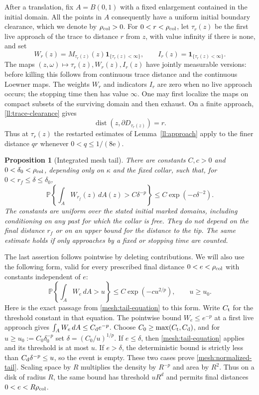 \documentclass[11pt]{article}
\newtheorem{proposition}[theorem]{Proposition}
\theoremstyle{definition}
\theoremstyle{remark}
\numberwithin{equation}{section}
\begin{document}
After a translation, fix $A=B(0,1)$ with a fixed enlargement contained in
the initial domain.  All the points in $A$ consequently have a uniform
initial boundary clearance, which we denote by $\rho_{\rm col}>0$.
For $0<r<\rho_{\rm col}$, let
$\tau_r(z)$ be the first live approach of the trace to distance $r$
from $z$, with value infinity if there is none, and set
\[
 W_r(z)=M_{\tau_r(z)}(z)\mathbf1_{\{\tau_r(z)<\infty\}},
 \qquad I_r(z)=\mathbf1_{\{\tau_r(z)<\infty\}}.
\]
The maps $(z,\omega)\mapsto\tau_r(z),W_r(z),I_r(z)$ have jointly
measurable versions: before killing this follows from continuous trace
distance and the continuous Loewner maps. The weights $W_r$ and
indicators $I_r$ are zero when no live approach occurs; the stopping
time then has value $\infty$.  One may first localize the maps on
compact subsets of the surviving domain and then exhaust.
On a finite approach, \eqref{ll:trace-clearance} gives
\[
 \operatorname{dist}(z,\partial D_{\tau_r(z)})=r.
\]
Thus at $\tau_r(z)$ the restarted estimates of Lemma~\ref{ll:approach}
apply to the finer distance $qr$ whenever $0<q\le1/(8\mathrm e)$.

\begin{proposition}[Integrated mesh tail]\label{mesh:tail}
There are constants $C,c>0$ and $0<\delta_0<\rho_{\rm col}$, depending only on $\kappa$ and
the fixed collar, such that, for $0<r_f\le\delta\le\delta_0$,
\begin{equation}
 \mathbb P\left\{\int_A W_{r_f}(z)\,dA(z)>C\delta^{-p}\right\}
 \le C\exp(-c\delta^{-2}).
 \label{mesh:tail-equation}
\end{equation}
The constants are uniform over the stated initial marked domains, including
conditioning on any past for which the collar is free.  They do not
depend on the final distance $r_f$ or on an upper bound for the
distance to the tip.  The same estimate holds if only approaches by a
fixed or stopping time are counted.
\end{proposition}

The last assertion follows pointwise by deleting contributions.  We
will also use the following form, valid for every prescribed final
distance $0<e<\rho_{\rm col}$ with constants independent of $e$:
\begin{equation}
 \mathbb P\left\{\int_AW_e\,dA>u\right\}
       \le C\exp(-cu^{2/p}),\qquad u\ge u_0.
 \label{mesh:normalized-tail}
\end{equation}
Here is the exact passage from \eqref{mesh:tail-equation} to this
form.  Write $C_{\rm t}$ for the threshold constant in that equation.
The pointwise bound $W_e\le e^{-p}$ at a first live approach gives
$\int_AW_e\,dA\le C_{\rm d}e^{-p}$.  Choose
$C_0\ge\max(C_{\rm t},C_{\rm d})$, and for
$u\ge u_0:=C_0\delta_0^{-p}$ set
$\delta=(C_0/u)^{1/p}$.  If $e\le\delta$, then
\eqref{mesh:tail-equation} applies and its threshold is at most $u$.
If $e>\delta$, the deterministic bound is strictly less than
$C_{\rm d}\delta^{-p}\le u$, so the event is empty.  These two cases
prove \eqref{mesh:normalized-tail}.  Scaling space by $R$ multiplies
the density by $R^{-p}$ and area by $R^2$.  Thus on a disk of radius
$R$, the same bound has threshold $uR^d$ and permits final distances
$0<e<R\rho_{\rm col}$.
\end{document}

